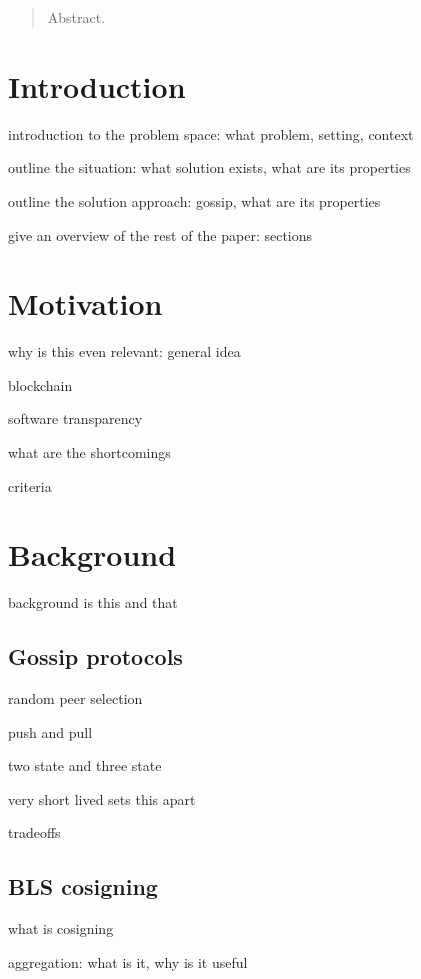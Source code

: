 \begin{abstract}

Abstract.

\end{abstract}


\section{Introduction}

introduction to the problem space: what problem, setting, context

outline the situation: what solution exists, what are its properties

outline the solution approach: gossip, what are its properties

give an overview of the rest of the paper: sections


\section{Motivation}

why is this even relevant: general idea

blockchain

software transparency~\cite{Ford16}

what are the shortcomings

criteria


\section{Background}

background is this and that


\subsection{Gossip protocols}

random peer selection

push and pull

two state and three state

very short lived sets this apart

tradeoffs


\subsection{BLS cosigning}

what is cosigning

aggregation: what is it, why is it useful

